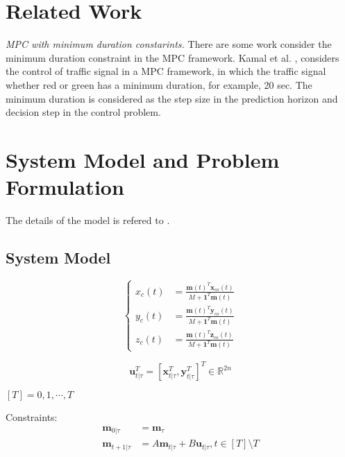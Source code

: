 \documentclass[english]{cccconf}
\begin{document}

\section{Related Work}\label{sec:related_work}
\textit{MPC with minimum duration constarints.}
There are some work consider the minimum duration constraint in the MPC framework. 
Kamal et al. \cite{kamal2012control}, \cite{kamal2015traffic} considers the control of traffic signal in a MPC framework, in which the traffic signal whether red or green has a minimum duration, for example, 20 sec.
The minimum duration is considered as the step size in the prediction horizon and decision step in the control problem.


\section{System Model and Problem Formulation}\label{sec:system_and_problem}
The details of the model is refered to \cite{miao2021optimal}.

\subsection{System Model}

\begin{equation}\label{aircraft cg constraint}
\left\{
\begin{aligned}
x_c(t) &= \frac{\textbf{m}(t)^T\textbf{x}_{co}(t)}{M+\textbf{1}^T\textbf{m}(t)}\\
y_c(t) &= \frac{\textbf{m}(t)^T\textbf{y}_{co}(t)}{M+\textbf{1}^T\textbf{m}(t)}\\
z_c(t) &= \frac{\textbf{m}(t)^T\textbf{z}_{co}(t)}{M+\textbf{1}^T\textbf{m}(t)}
\end{aligned}
\right.
\end{equation}

\begin{equation}
  \mathbf{u}_{t|\tau}^T = \left[\mathbf{x}_{t|\tau}^T, \mathbf{y}_{t|\tau}^T\right]^T \in \mathbb{R}^{2n}
\end{equation}

$[T] = {0, 1, \cdots, T}$

Constraints:
\begin{equation}\label{eq:fuel_weight_dynamics}
\begin{aligned}
\textbf{m}_{0|\tau} &= \textbf{m}_{\tau}\\
\textbf{m}_{t+1|\tau} &= A\textbf{m}_{t|\tau}+ B\textbf{u}_{t|\tau}, t \in [T]\setminus T
\end{aligned}
\end{equation}
\end{document}
